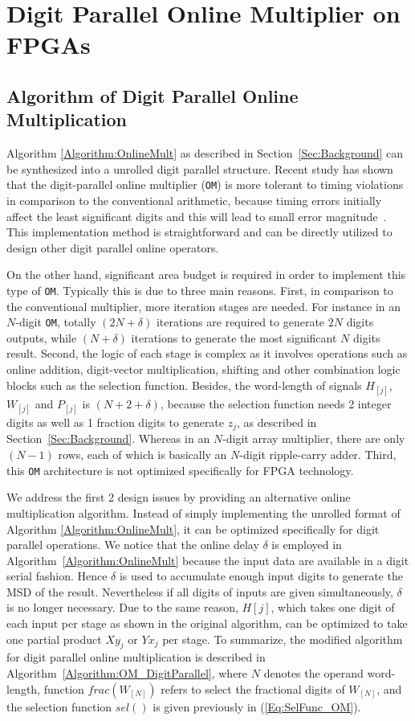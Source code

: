 \documentclass[conference]{IEEEtran}
\begin{document}
\section{Digit Parallel Online Multiplier on FPGAs}\label{Sec:OM_FPGA}
\subsection{Algorithm of Digit Parallel Online Multiplication}
Algorithm \ref{Algorithm:OnlineMult} as described in Section~\ref{Sec:Background} can be synthesized into a unrolled digit parallel structure. Recent study has shown that the digit-parallel online multiplier (\texttt{OM}) is more tolerant to timing violations in comparison to the conventional arithmetic, because timing errors initially affect the least significant digits and this will lead to small error magnitude~\cite{SKDAC14}. This implementation method is straightforward and can be directly utilized to design other digit parallel online operators.

On the other hand, significant area budget is required in order to implement this type of \texttt{OM}. Typically this is due to three main reasons. First, in comparison to the conventional multiplier, more iteration stages are needed. For instance in an $N$-digit \texttt{OM}, totally $(2N+\delta)$ iterations are required to generate $2N$ digits outputs, while $(N+\delta)$ iterations to generate the most significant $N$ digits result. Second, the logic of each stage is complex as it involves operations such as online addition, digit-vector multiplication, shifting and other combination logic blocks such as the selection function. Besides, the word-length of signals $H_{[j]}$, $W_{[j]}$ and $P_{[j]}$ is $(N+2+\delta)$, because the selection function needs 2 integer digits as well as 1 fraction digits to generate $z_j$, as described in Section~\ref{Sec:Background}. Whereas in an $N$-digit array multiplier, there are only $(N-1)$ rows, each of which is basically an $N$-digit ripple-carry adder. Third, this \texttt{OM} architecture is not optimized specifically for FPGA technology.

We address the first 2 design issues by providing an alternative online multiplication algorithm. Instead of simply implementing the unrolled format of Algorithm \ref{Algorithm:OnlineMult}, it can be optimized specifically for digit parallel operations. We notice that the online delay $\delta$ is employed in Algorithm~\ref{Algorithm:OnlineMult} because the input data are available in a digit serial fashion. Hence $\delta$ is used to accumulate enough input digits to generate the MSD of the result. Nevertheless if all digits of inputs are given simultaneously, $\delta$ is no longer necessary. Due to the same reason, $H[j]$, which takes one digit of each input per stage as shown in the original algorithm, can be optimized to take one partial product $Xy_j$ or $Yx_j$ per stage. To summarize, the modified algorithm for digit parallel online multiplication is described in Algorithm~\ref{Algorithm:OM_DigitParallel}, where $N$ denotes the operand word-length, function $frac(W_{[N]})$ refers to select the fractional digits of $W_{[N]}$, and the selection function $sel()$ is given previously in (\ref{Eq:SelFunc_OM}).
\end{document}
